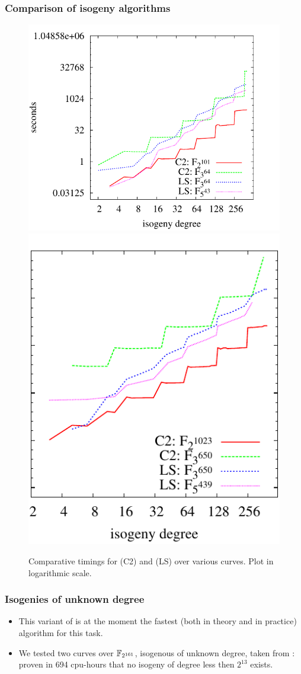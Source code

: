 \documentclass[10pt,usepdftitle=false]{beamer}
\begin{document}
\begin{frame}
  \frametitle{Comparison of isogeny algorithms}
  
  \begin{figure}
    \centering
    \includegraphics[height=0.5\textwidth]{../isogeny/C2-LS}
    \includegraphics[height=0.5\textwidth]{../isogeny/C2-LS2}
    \caption{Comparative timings for \cite{couveignes96} (C2) and
      \cite{lercier+sirvent08} (LS) over various curves. Plot in
      logarithmic scale.}
  \label{fig:comp}
\end{figure}
\end{frame}

\begin{frame}
  \frametitle{Isogenies of unknown degree}
  \large

  \begin{itemize}
  \item This variant of \cite{couveignes96} is at the moment the
    fastest (both in theory and in practice) algorithm for this
    task.
  \item We tested two curves over $\mathbb{F}_{2^{161}}$, isogenous of
    unknown degree, taken from \cite{teske06}: proven in 694
    cpu-hours that no isogeny of degree less then $2^{13}$ exists.
  \end{itemize}
\end{frame}
\end{document}
